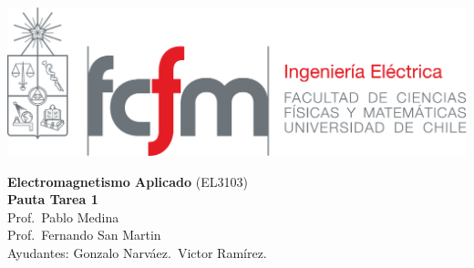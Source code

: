 \documentclass[
  11pt,
  letterpaper,
  answers
]{exam}
\begin{document}
\begin{minipage}{0.42\textwidth}
    \includegraphics[width=\textwidth]{../fcfm_die}
\end{minipage}
\begin{minipage}{0.53\textwidth}
\begin{center} 
\large\textbf{Electromagnetismo Aplicado} (EL3103) \\
\large\textbf{Pauta Tarea 1} \\
\normalsize Prof.~Pablo Medina\\
\normalsize Prof.~Fernando San Martin\\
\normalsize Ayudantes: Gonzalo Narváez.~Victor Ramírez. 
\end{center}
\end{minipage}

\vspace{0.5cm}
\noindent
\vspace{.85cm}
\end{document}
